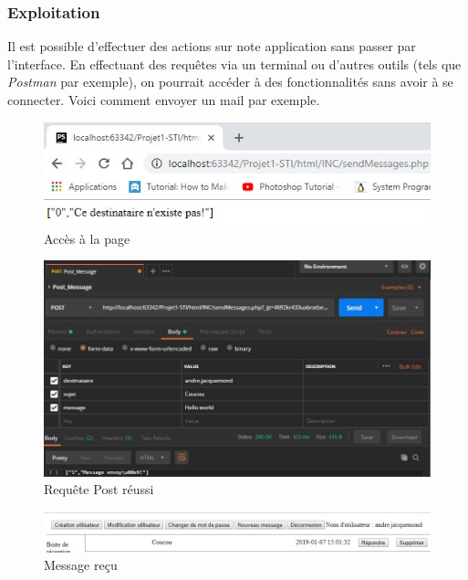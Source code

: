 \documentclass[12pt]{article}
\begin{document}
\subsubsection{Exploitation}
Il est possible d'effectuer des actions sur note application sans passer par l'interface. En effectuant des requêtes via un terminal ou d'autres outils (tels que \textit{Postman} par exemple), on pourrait accéder à des fonctionnalités sans avoir à se connecter.
Voici comment envoyer un mail par exemple.
\begin{figure}[H]
\centering
\includegraphics{images/withoutLogin.jpg}
\caption{Accès à la page}
\end{figure}
\begin{figure}[H]
\centering
\includegraphics[width=\linewidth]{images/postmanSendMessage.jpg}
\caption{Requête Post réussi}
\end{figure}
\begin{figure}[H]
\centering
\includegraphics[width=\linewidth]{images/postmanSendMessageSuccess.jpg}
\caption{Message reçu}
\end{figure}
\end{document}
